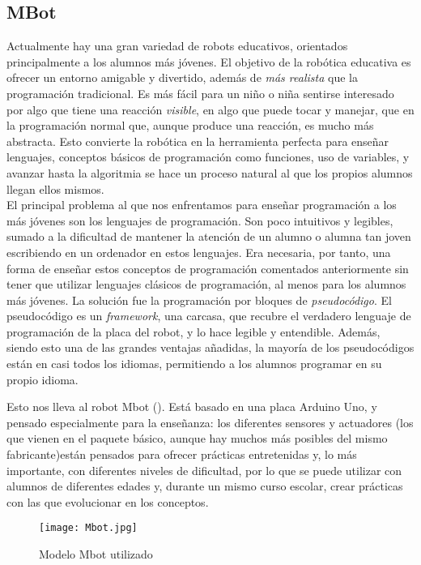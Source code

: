 \subsection{MBot}\label{subsec:mbot}
Actualmente hay una gran variedad de robots educativos, orientados principalmente a los alumnos más jóvenes. El objetivo de la robótica educativa es ofrecer un entorno amigable y divertido, además de \textit{más realista} que la programación tradicional. Es más fácil para un niño o niña sentirse interesado por algo que tiene una reacción \textit{visible}, en algo que puede tocar y manejar, que en la programación normal que, aunque produce una reacción, es mucho más abstracta. Esto convierte la robótica en la herramienta perfecta para enseñar lenguajes, conceptos básicos de programación como funciones, uso de variables, y avanzar hasta la algoritmia se hace un proceso natural al que los propios alumnos llegan ellos mismos. \\
El principal problema al que nos enfrentamos para enseñar programación a los más jóvenes son los lenguajes de programación. Son poco intuitivos y legibles, sumado a la dificultad de mantener la atención de un alumno o alumna tan joven escribiendo en un ordenador en estos lenguajes. Era necesaria, por tanto, una forma de enseñar estos conceptos de programación comentados anteriormente sin tener que utilizar lenguajes clásicos de programación, al menos para los alumnos más jóvenes. La solución fue la programación por bloques de \textit{pseudocódigo}. El pseudocódigo es un \textit{framework}, una carcasa, que recubre el verdadero lenguaje de programación de la placa del robot, y lo hace legible y entendible. Además, siendo esto una de las grandes ventajas añadidas, la mayoría de los pseudocódigos están en casi todos los idiomas, permitiendo a los alumnos programar en su propio idioma. \\
\par Esto nos lleva al robot Mbot (\cite{makeblock}). Está basado en una placa Arduino Uno, y pensado especialmente para la enseñanza: los diferentes sensores y actuadores (los que vienen en el paquete básico, aunque hay muchos más posibles del mismo fabricante)están pensados para ofrecer prácticas entretenidas y, lo más importante, con diferentes niveles de dificultad, por lo que se puede utilizar con alumnos de diferentes edades y, durante un mismo curso escolar, crear prácticas con las que evolucionar en los conceptos. 
\begin{figure}[H]
	\texttt{[image: Mbot.jpg]}\centering
	\label{img:mbot}\caption{Modelo Mbot utilizado}
\end{figure}
